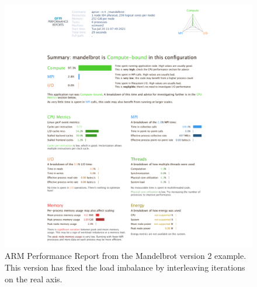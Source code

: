 \documentclass[a4paper,titlepage]{article}
\begin{document}
\begin{figure}[htbp]
\begin{center}
\includegraphics[scale=0.35]{figures/mandelbrot_v2_PerformanceReport}
\caption{ARM Performance Report from the Mandelbrot version 2 example. This version has fixed the load imbalance by interleaving iterations on the real axis.}
\label{fig:perf-report_MB2}
\end{center}
\end{figure}
\end{document}
